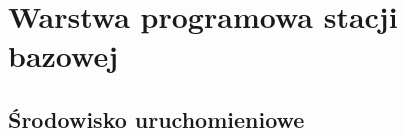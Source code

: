 \chapter{Warstwa programowa stacji bazowej}
\label{chap:oprogramowanie}


\section{Środowisko uruchomieniowe}
\label{sec:srodowisko}

